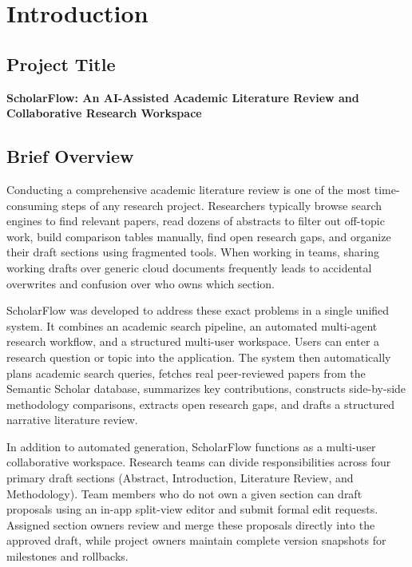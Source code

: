 \documentclass[11pt,a4paper]{article}
\begin{document}
\tableofcontents
\clearpage

\setcounter{page}{1}
\pagestyle{plain}

\section{Introduction}

\subsection{Project Title}
\textbf{ScholarFlow: An AI-Assisted Academic Literature Review and Collaborative Research Workspace}

\subsection{Brief Overview}
Conducting a comprehensive academic literature review is one of the most time-consuming steps of any research project. Researchers typically browse search engines to find relevant papers, read dozens of abstracts to filter out off-topic work, build comparison tables manually, find open research gaps, and organize their draft sections using fragmented tools. When working in teams, sharing working drafts over generic cloud documents frequently leads to accidental overwrites and confusion over who owns which section.

ScholarFlow was developed to address these exact problems in a single unified system. It combines an academic search pipeline, an automated multi-agent research workflow, and a structured multi-user workspace. Users can enter a research question or topic into the application. The system then automatically plans academic search queries, fetches real peer-reviewed papers from the Semantic Scholar database, summarizes key contributions, constructs side-by-side methodology comparisons, extracts open research gaps, and drafts a structured narrative literature review.

In addition to automated generation, ScholarFlow functions as a multi-user collaborative workspace. Research teams can divide responsibilities across four primary draft sections (Abstract, Introduction, Literature Review, and Methodology). Team members who do not own a given section can draft proposals using an in-app split-view editor and submit formal edit requests. Assigned section owners review and merge these proposals directly into the approved draft, while project owners maintain complete version snapshots for milestones and rollbacks.
\end{document}
